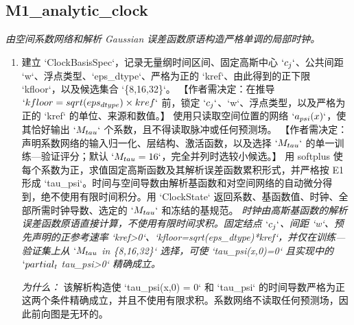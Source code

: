 \documentclass[10pt,a4paper]{article}
\begin{document}
\subsection*{M1\_analytic\_clock}
\emph{由空间系数网络和解析 Gaussian 误差函数原语构造严格单调的局部时钟。}
\begin{enumerate}[leftmargin=*,start=2]
  \item 建立 `ClockBasisSpec`，记录无量纲时间区间、固定高斯中心 \(`c_{j}`\)、公共间距 `w`、浮点类型、`eps\_dtype`、严格为正的 `kref`、由此得到的正下限 `kfloor`，以及候选集合 `\{8,16,32\}`。 【作者需决定：在推导 \(`kfloor=sqrt(eps_{dtype})\times kref`\) 前，锁定 \(`c_{j}`\)、`w`、浮点类型，以及严格为正的 `kref` 的单位、来源和数值。】 使用只读取空间位置的网络 \(`a_{psi}(x)`\)，使其恰好输出 \(`M_{tau}`\) 个系数，且不得读取脉冲或任何预测场。 【作者需决定：声明系数网络的输入归一化、层结构、激活函数，以及选择 \(`M_{tau}`\) 的单一训练---验证评分；默认 \(`M_{tau}=16`\)，完全并列时选较小候选。】 用 softplus 使每个系数为正，求值固定高斯函数及其解析误差函数累积形式，并严格按 E1 形成 `tau\_psi`。时间与空间导数由解析基函数和对空间网络的自动微分得到，绝不使用有限时间积分。用 `ClockState` 返回系数、基函数值、时钟、全部所需时钟导数、选定的 \(`M_{tau}`\) 和冻结的基规范。
\noindent\emph{时钟由高斯基函数的解析误差函数原语直接计算，不使用有限时间求积。固定结点 \(`c_{j}`\)、间距 `w`、预先声明的正参考速率 `kref>0`、`kfloor=sqrt(eps\_dtype)*kref`，并仅在训练---验证集上从 \(`M_{tau}\) in \{8,16,32\}` 选择，可使 `tau\_psi(x,0)=0` 且实现中的 \(`partial_{t}\) tau\_psi>0` 精确成立。}
\par{}
\par\emph{为什么：} 该解析构造使 `tau\_psi(x,0) = 0` 和 `tau\_psi` 的时间导数严格为正这两个条件精确成立，并且不使用有限求积。系数网络不读取任何预测场，因此前向图是无环的。
\end{enumerate}
\end{document}
